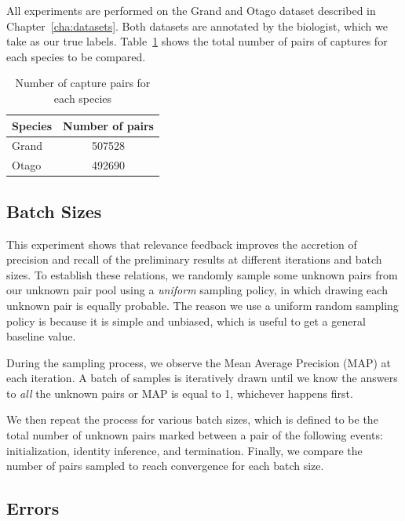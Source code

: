 All experiments are performed on the Grand and Otago dataset described in
Chapter~\ref{cha:datasets}. Both datasets are annotated by the biologist, which
we take as our true labels. Table~\ref{tab:species_npairs} shows the total
number of pairs of captures for each species to be compared.

\begin{table}[t]
\captionsetup{justification=centering}
  \caption{Number of capture pairs for each species}
  \label{tab:species_npairs} %
  \centering
  \begin{tabular}{lc}
    \toprule
    Species & Number of pairs \\
    \midrule
    Grand & 507528 \\
    Otago & 492690 \\
    \bottomrule
  \end{tabular}
\end{table}

\subsection{Batch Sizes} %
\label{sub:batch_sizes}

This experiment shows that relevance feedback improves the accretion of
precision and recall of the preliminary results at different iterations and
batch sizes. To establish these relations, we randomly sample some unknown pairs
from our unknown pair pool using a \emph{uniform} sampling policy, in which
drawing each unknown pair is equally probable. The reason we use a uniform
random sampling policy is because it is simple and unbiased, which is useful to
get a general baseline value.

During the sampling process, we observe the Mean Average Precision (MAP) at each
iteration. A batch of samples is iteratively drawn until we know the answers to
\emph{all} the unknown pairs or MAP is equal to 1, whichever happens first.

We then repeat the process for various batch sizes, which is defined to be the
total number of unknown pairs marked between a pair of the following events:
initialization, identity inference, and termination. Finally, we compare the
number of pairs sampled to reach convergence for each batch size.

\subsection{Errors} %
\label{sub:relevance_errors}

